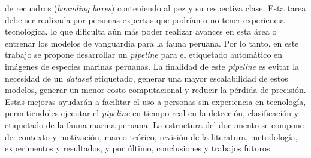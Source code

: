de recuadros (\textit{bounding boxes}) conteniendo al pez y su respectiva clase.
Esta tarea debe ser realizada por personas expertas que podrían o no tener experiencia 
tecnológica, lo que dificulta aún más poder realizar avances en esta área o entrenar 
los modelos de vanguardia para la fauna peruana. 
\newline
\newline
Por lo tanto, en este trabajo se propone desarrollar un \textit{pipeline} 
para el etiquetado automático en imágenes de especies marinas peruanas. 
La finalidad de este \textit{pipeline} es evitar la necesidad de un 
\textit{dataset} etiquetado, generar una mayor escalabilidad de estos 
modelos, generar un menor costo computacional y reducir la pérdida de 
precisión. Estas mejoras ayudarán a facilitar el uso a personas sin experiencia 
en tecnología, permitiendoles ejecutar el \textit{pipeline} en tiempo real 
en la detección, clasificación y etiquetado de la fauna marina peruana. 
\newline
\newline
La estructura del documento se compone de: contexto y motivación, marco 
teórico, revisión de la literatura, metodología, experimentos y resultados, 
y por último, conclusiones y trabajos futuros.